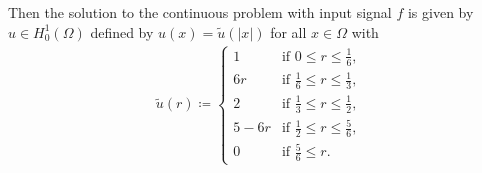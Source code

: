 \begin{frame}
  Then the solution to the continuous problem with input signal $f$ is given by
  $u\in H^1_0(\Omega)$ defined by $u(x)=\tilde{u}(|x|)$ for all $x\in\Omega$
  with 
  \begin{align*}
    \tilde{u}(r)\coloneqq
    \begin{cases}
      1 & \text{if } 0\leq r\leq\frac{1}{6},\\
      6r & \text{if } \frac{1}{6}\leq r\leq\frac{1}{3},\\
      2 &\text{if } \frac{1}{3}\leq r\leq\frac{1}{2},\\
      5-6r &\text{if } \frac{1}{2}\leq r\leq\frac{5}{6},\\
      0 &\text{if } \frac{5}{6}\leq r.
    \end{cases}
  \end{align*}
  

\end{frame}
